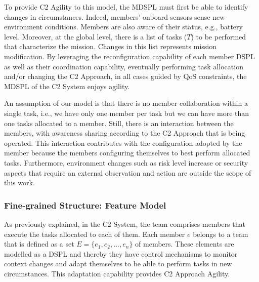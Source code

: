 To provide C2 Agility to this model, the MDSPL must first be able to identify changes in circumstances. Indeed, members' onboard sensors  sense new environment conditions. Members are also aware of their status, e.g., battery level. Moreover, at the global level, there is a list of tasks ($T$) to be performed that characterize the mission. Changes in this list represents mission modification. By leveraging the reconfiguration capability of each member DSPL as well as their coordination capability, eventually performing task allocation and/or changing the C2 Approach, in all cases guided by QoS constraints, the MDSPL of the C2 System enjoys agility. 

An assumption of our model is that there is no member collaboration within a single task, i.e., we have only one member per task but we can have more than one tasks allocated to a member. Still, there is an interaction between the members, with awareness sharing according to the C2 Approach that is being operated. This interaction contributes with the configuration adopted by the member because the members  configuring themselves to best perform allocated tasks. Furthermore, environment changes such as risk level increase or security aspects that require an external observation and action are outside the scope of this work.

\begin{center}
\end{center}


\subsubsection{Fine-grained Structure: Feature Model}

As previously explained, in the C2 System, the team comprises members that execute the tasks allocated to each of them. Each member $e$ belongs to a team that is defined as a set $E=\{e_1, e_2, ..., e_n\}$ of members. These elements are modelled as a DSPL and thereby they have control mechanisms to monitor context changes and adapt themselves to be able to perform tasks in new circumstances. This adaptation capability provides C2 Approach Agility.

